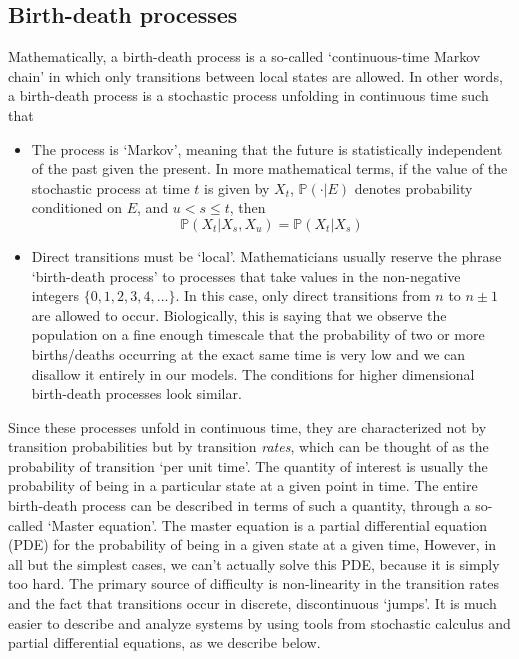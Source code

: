 \subsection{Birth-death processes}
Mathematically, a birth-death process is a so-called `continuous-time Markov chain' in which only transitions between local states are allowed. In other words, a birth-death process is a stochastic process unfolding in continuous time such that
\begin{itemize}
	\item The process is `Markov', meaning that the future is statistically independent of the past given the present. In more mathematical terms, if the value of the stochastic process at time $t$ is given by $X_t$, $\mathbb{P}(\cdot | E)$ denotes probability conditioned on $E$, and $u < s \leq t$, then
	\begin{equation*}
	\mathbb{P}(X_t | X_s, X_u) = \mathbb{P}(X_t | X_s)
	\end{equation*}
	\item Direct transitions must be `local'. Mathematicians usually reserve the phrase `birth-death process' to processes that take values in the non-negative integers $\{0,1,2,3,4,\ldots\}$. In this case, only direct transitions from $n$ to $n \pm 1$ are allowed to occur. Biologically, this is saying that we observe the population on a fine enough timescale that the probability of two or more births/deaths occurring at the exact same time is very low and we can disallow it entirely in our models. The conditions for higher dimensional birth-death processes look similar.
\end{itemize}
Since these processes unfold in continuous time, they are characterized not by transition probabilities but by transition \emph{rates}, which can be thought of as the probability of transition `per unit time'. The quantity of interest is usually the probability of being in a particular state at a given point in time. The entire birth-death process can be described in terms of such a quantity, through a so-called `Master equation'. The master equation is a partial differential equation (PDE) for the probability of being in a given state at a given time, However, in all but the simplest cases, we can't actually solve this PDE, because it is simply too hard. The primary source of difficulty is non-linearity in the transition rates and the fact that transitions occur in discrete, discontinuous `jumps'. It is much easier to describe and analyze systems by using tools from stochastic calculus and partial differential equations, as we describe below.


